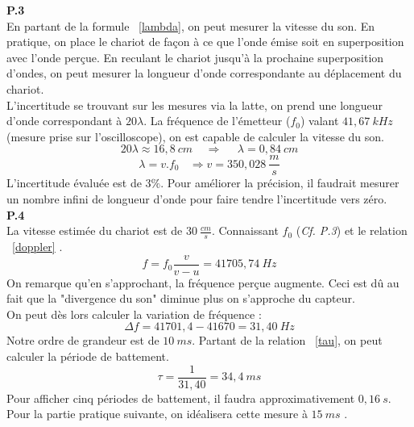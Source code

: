 \documentclass	[11pt, a4paper, openany]{book}
\begin{document}
		\textbf{P.3}\\
		En partant de la formule ~\eqref{lambda}, on peut mesurer la vitesse du son. En pratique, on place le chariot de façon à ce que l'onde émise soit en superposition avec l'onde perçue. En reculant le chariot jusqu'à la prochaine superposition d'ondes, on peut mesurer la longueur d'onde correspondante au déplacement du chariot.\\
		
		L'incertitude se trouvant sur les mesures via la latte, on prend une longueur d'onde correspondant à $20\lambda$. La fréquence de l'émetteur ($f_0$) valant $41,67\ kHz$ (mesure prise sur l'oscilloscope), on est capable de calculer la vitesse du son.
		\begin{equation}
			20\lambda \approx 16,8\ cm\ \ \ \ \ \Rightarrow\ \ \ \ \ \ \lambda = 0,84\ cm
		\end{equation}
		\begin{equation}
			\lambda = v.f_0\ \ \ \ \Rightarrow v = 350,028\ \frac{m}{s}
		\end{equation}
		L'incertitude évaluée est de $3\%$. Pour améliorer la précision, il faudrait mesurer un nombre infini de longueur d'onde pour faire tendre l'incertitude vers zéro.\\
		
		\textbf{P.4}\\
		La vitesse estimée du chariot est de $30\ \frac{cm}{s}$. Connaissant $f_0$ (\textit{Cf. P.3}) et le relation ~\eqref{doppler} .
		\begin{equation}
			f = f_0 \frac{v}{v - u} = 41705,74\ Hz
		\end{equation} 
		On remarque qu'en s'approchant, la fréquence perçue augmente. Ceci est dû au fait que la "divergence du son" diminue plus on s'approche du capteur.\\
		On peut dès lors calculer la variation de fréquence :
		\begin{equation}
			\Delta f =  41701,4 - 41670 = 31,40\ Hz
		\end{equation}
		Notre ordre de grandeur est de $10\ ms$. Partant de la relation ~\eqref{tau}, on peut calculer la période de battement.
		\begin{equation}
			\tau = \frac{1}{31,40} = 34,4\ ms
		\end{equation}
		Pour afficher cinq périodes de battement, il faudra approximativement $0,16\ s$. Pour la partie pratique suivante, on idéalisera cette mesure à $15\ ms$ .\\
		
\end{document}
